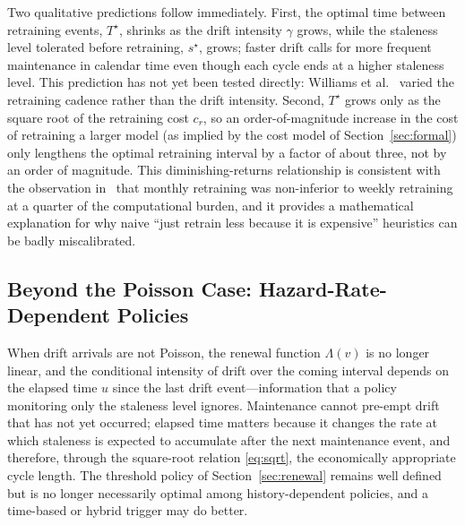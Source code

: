 \documentclass[electronics,article,submit,pdftex,moreauthors]{Definitions/mdpi}
\begin{document}
Two qualitative predictions follow immediately. First, the optimal time between retraining events, $T^\star$, shrinks as the drift intensity $\gamma$ grows, while the staleness level tolerated before retraining, $s^\star$, grows; faster drift calls for more frequent maintenance in calendar time even though each cycle ends at a higher staleness level. This prediction has not yet been tested directly: Williams et al.~\cite{Williams2026} varied the retraining cadence rather than the drift intensity. Second, $T^\star$ grows only as the square root of the retraining cost $c_r$, so an order-of-magnitude increase in the cost of retraining a larger model (as implied by the cost model of Section~\ref{sec:formal}) only lengthens the optimal retraining interval by a factor of about three, not by an order of magnitude. This diminishing-returns relationship is consistent with the observation in~\cite{Williams2026} that monthly retraining was non-inferior to weekly retraining at a quarter of the computational burden, and it provides a mathematical explanation for why naive ``just retrain less because it is expensive'' heuristics can be badly miscalibrated.

\subsection{Beyond the Poisson Case: Hazard-Rate-Dependent Policies}\label{sec:hazard}

When drift arrivals are not Poisson, the renewal function $\Lambda(v)$ is no longer linear, and the conditional intensity of drift over the coming interval depends on the elapsed time $u$ since the last drift event---information that a policy monitoring only the staleness level ignores. Maintenance cannot pre-empt drift that has not yet occurred; elapsed time matters because it changes the rate at which staleness is expected to accumulate after the next maintenance event, and therefore, through the square-root relation \eqref{eq:sqrt}, the economically appropriate cycle length. The threshold policy of Section~\ref{sec:renewal} remains well defined but is no longer necessarily optimal among history-dependent policies, and a time-based or hybrid trigger may do better.
\end{document}
